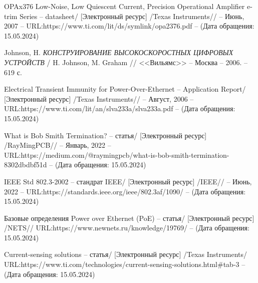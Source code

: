 \begin{thebibliography}{00}
 OPAx376 Low-Noise, Low Quiescent Current, Precision Operational Amplifier
e-trim Series
-- datasheet/
[Электронный ресурс] /Texas Instruments// -- Июнь, 2007 -- 
URL:https://www.ti.com/lit/ds/symlink/opa2376.pdf
-- (Дата обращения: 15.05.2024)

 Johnson, H.
\emph{КОНСТРУИРОВАНИЕ ВЫСОКОСКОРОСТНЫХ ЦИФРОВЫХ УСТРОЙСТВ} / H. Johnson, M. Graham // <<Вильямс>> --
Москва -- 2006. -- 619 с.

 Electrical Transient Immunity for 
Power-Over-Ethernet
-- Application Report/
[Электронный ресурс] /Texas Instruments// -- Август, 2006 -- 
URL:https://www.ti.com/lit/an/slva233a/slva233a.pdf
-- (Дата обращения: 15.05.2024)

 What is Bob Smith Termination?
-- статья/
[Электронный ресурс] /RayMingPCB// -- Январь, 2022 -- 
URL:https://medium.com/@raymingpcb/what-is-bob-smith-termination-8302dbdbf51d
-- (Дата обращения: 15.05.2024)


 IEEE Std 802.3-2002
-- стандрат IEEE/
[Электронный ресурс] /IEEE// -- Июнь, 2022 -- 
URL:https://standards.ieee.org/ieee/802.3af/1090/
-- (Дата обращения: 15.05.2024)

 Базовые определения Power over Ethernet (PoE)
-- статья/
[Электронный ресурс] /NETS// 
URL:https://www.newnets.ru/knowledge/19769/
-- (Дата обращения: 15.05.2024)


 Current-sensing solutions
-- статья/
[Электронный ресурс] /Texas Instruments/ 
URL:https://www.ti.com/technologies/current-sensing-solutions.html\#tab-3
-- (Дата обращения: 15.05.2024)


\end{thebibliography}

